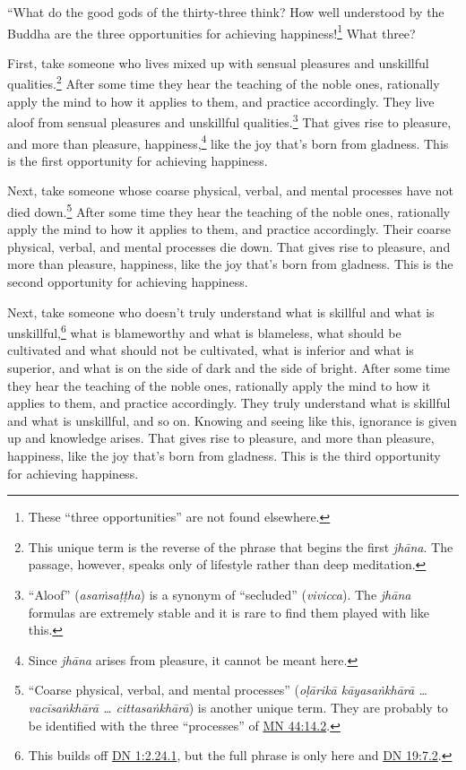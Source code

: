 \documentclass[12pt,openany]{book}%
\begin{document}
“What do the good gods of the thirty-three think? How well understood by the Buddha are the three opportunities for achieving happiness!\footnote{These “three opportunities” are not found elsewhere. } What three? 

First, take someone who lives mixed up with sensual pleasures and unskillful qualities.\footnote{This unique term is the reverse of the phrase that begins the first \textit{\textsanskrit{jhāna}}. The passage, however, speaks only of lifestyle rather than deep meditation. } After some time they hear the teaching of the noble ones, rationally apply the mind to how it applies to them, and practice accordingly. They live aloof from sensual pleasures and unskillful qualities.\footnote{“Aloof” (\textit{\textsanskrit{asaṁsaṭṭha}}) is a synonym of “secluded” (\textit{vivicca}). The \textit{\textsanskrit{jhāna}} formulas are extremely stable and it is rare to find them played with like this. } That gives rise to pleasure, and more than pleasure, happiness,\footnote{Since \textit{\textsanskrit{jhāna}} arises from pleasure, it cannot be meant here. } like the joy that’s born from gladness. This is the first opportunity for achieving happiness. 

Next, take someone whose coarse physical, verbal, and mental processes have not died down.\footnote{“Coarse physical, verbal, and mental processes” (\textit{\textsanskrit{oḷārikā} \textsanskrit{kāyasaṅkhārā} …\textsanskrit{vacīsaṅkhārā} … \textsanskrit{cittasaṅkhārā}}) is another unique term. They are probably to be identified with the three “processes” of \href{https://suttacentral.net/mn44/en/sujato\#14.2}{MN 44:14.2}. } After some time they hear the teaching of the noble ones, rationally apply the mind to how it applies to them, and practice accordingly. Their coarse physical, verbal, and mental processes die down. That gives rise to pleasure, and more than pleasure, happiness, like the joy that’s born from gladness. This is the second opportunity for achieving happiness. 

Next, take someone who doesn’t truly understand what is skillful and what is unskillful,\footnote{This builds off \href{https://suttacentral.net/dn1/en/sujato\#2.24.1}{DN 1:2.24.1}, but the full phrase is only here and \href{https://suttacentral.net/dn19/en/sujato\#7.2}{DN 19:7.2}. } what is blameworthy and what is blameless, what should be cultivated and what should not be cultivated, what is inferior and what is superior, and what is on the side of dark and the side of bright. After some time they hear the teaching of the noble ones, rationally apply the mind to how it applies to them, and practice accordingly. They truly understand what is skillful and what is unskillful, and so on. Knowing and seeing like this, ignorance is given up and knowledge arises. That gives rise to pleasure, and more than pleasure, happiness, like the joy that’s born from gladness. This is the third opportunity for achieving happiness. 
\end{document}
